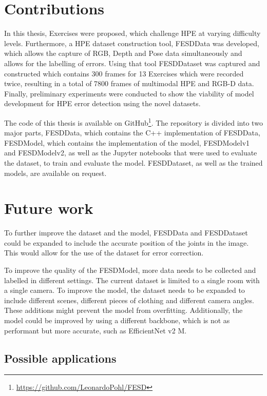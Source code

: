 \section{Contributions}

In this thesis, Exercises were proposed, which challenge HPE at varying difficulty levels. Furthermore, a HPE dataset construction tool, FESDData was developed, which allows the capture of RGB, Depth and Pose data simultaneously and allows for the labelling of errors. Using that tool FESDDataset was captured and constructed which contains 300 frames for 13 Exercises which were recorded twice, resulting in a total of 7800 frames of multimodal HPE and RGB-D data. Finally, preliminary experiments were conducted to show the viability of model development for HPE error detection using the novel datasets.

The code of this thesis is available on GitHub\footnote{\url{https://github.com/LeonardoPohl/FESD}}. The repository is divided into two major parts, FESDData, which contains the C++ implementation of FESDData, FESDModel, which contains the implementation of the model, FESDModelv1 and FESDModelv2, as well as the Jupyter notebooks that were used to evaluate the dataset, to train and evaluate the model. FESDDataset, as well as the trained models, are available on request.  

\section{Future work}
\label{sec:future_work}

To further improve the dataset and the model, FESDData and FESDDataset could be expanded to include the accurate position of the joints in the image. This would allow for the use of the dataset for error correction.

To improve the quality of the FESDModel, more data needs to be collected and labelled in different settings. The current dataset is limited to a single room with a single camera. To improve the model, the dataset needs to be expanded to include different scenes, different pieces of clothing and different camera angles. These additions might prevent the model from overfitting. Additionally, the model could be improved by using a different backbone, which is not as performant but more accurate, such as EfficientNet v2 M.

\subsection{Possible applications}

